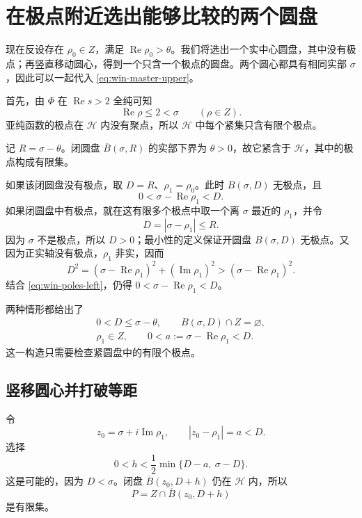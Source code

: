\section{在极点附近选出能够比较的两个圆盘}

现在反设存在 $\rho_0\in Z$，满足
$\operatorname{Re}\rho_0>\theta$。我们将选出一个实中心圆盘，其中没有极点；再竖直移动圆心，得到一个只含一个极点的圆盘。两个圆心都具有相同实部 $\sigma$，因此可以一起代入
\eqref{eq:win-master-upper}。

首先，由 $\Phi$ 在 $\operatorname{Re}s>2$ 全纯可知
\begin{equation}
 \operatorname{Re}\rho\le2<\sigma\qquad(\rho\in Z).
 \label{eq:win-poles-left}
\end{equation}
亚纯函数的极点在 $\mathcal H$ 内没有聚点，所以 $\mathcal H$ 中每个紧集只含有限个极点。

记 $R=\sigma-\theta$。闭圆盘
$\overline B(\sigma,R)$ 的实部下界为 $\theta>0$，故它紧含于 $\mathcal H$，其中的极点构成有限集。

如果该闭圆盘没有极点，取 $D=R$、$\rho_1=\rho_0$。此时 $B(\sigma,D)$ 无极点，且
\[
 0<\sigma-\operatorname{Re}\rho_1<D.
\]
如果闭圆盘中有极点，就在这有限多个极点中取一个离 $\sigma$ 最近的 $\rho_1$，并令
\[
 D=|\sigma-\rho_1|\le R.
\]
因为 $\sigma$ 不是极点，所以 $D>0$；最小性的定义保证开圆盘 $B(\sigma,D)$ 无极点。又因为正实轴没有极点，$\rho_1$ 非实，因而
\[
 D^2=(\sigma-\operatorname{Re}\rho_1)^2
             +(\operatorname{Im}\rho_1)^2
       >(\sigma-\operatorname{Re}\rho_1)^2.
\]
结合 \eqref{eq:win-poles-left}，仍得
$0<\sigma-\operatorname{Re}\rho_1<D$。

两种情形都给出了
\begin{equation}
 \begin{gathered}
 0<D\le\sigma-\theta,\qquad
 B(\sigma,D)\cap Z=\varnothing,\\
 \rho_1\in Z,\qquad
 0<a:=\sigma-\operatorname{Re}\rho_1<D.
 \end{gathered}
 \label{eq:win-free-disc}
\end{equation}
这一构造只需要检查紧圆盘中的有限个极点。

\subsection{竖移圆心并打破等距}

令
\[
 z_0=\sigma+i\operatorname{Im}\rho_1,
 \qquad |z_0-\rho_1|=a<D.
\]
选择
\begin{equation}
 0<h<\frac12\min\{D-a,\ \sigma-D\}.
 \label{eq:win-shift-margin}
\end{equation}
这是可能的，因为 $D<\sigma$。闭盘
$\overline B(z_0,D+h)$ 仍在 $\mathcal H$ 内，所以
\[
 P=Z\cap\overline B(z_0,D+h)
\]
是有限集。

